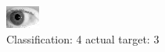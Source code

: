 \begin{figure}[h!]
\begin{center}
\includegraphics[width=0.60\columnwidth]{figures/ID183_class_4_target_3.png}
\end{center}
\caption{ Classification: 4 actual target: 3}
\label{fig:ID183_class_4_target_3}
\end{figure}
